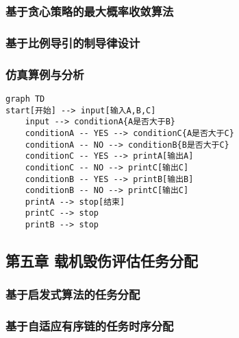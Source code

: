 \hypertarget{ux57faux4e8eux8d2aux5fc3ux7b56ux7565ux7684ux6700ux5927ux6982ux7387ux6536ux655bux7b97ux6cd5}{%
\subsubsection{基于贪心策略的最大概率收敛算法}\label{ux57faux4e8eux8d2aux5fc3ux7b56ux7565ux7684ux6700ux5927ux6982ux7387ux6536ux655bux7b97ux6cd5}}

\hypertarget{ux57faux4e8eux6bd4ux4f8bux5bfcux5f15ux7684ux5236ux5bfcux5f8bux8bbeux8ba1}{%
\subsubsection{基于比例导引的制导律设计}\label{ux57faux4e8eux6bd4ux4f8bux5bfcux5f15ux7684ux5236ux5bfcux5f8bux8bbeux8ba1}}

\hypertarget{ux4effux771fux7b97ux4f8bux4e0eux5206ux6790}{%
\subsubsection{仿真算例与分析}\label{ux4effux771fux7b97ux4f8bux4e0eux5206ux6790}}

\begin{verbatim}
graph TD
start[开始] --> input[输入A,B,C]
    input --> conditionA{A是否大于B}
    conditionA -- YES --> conditionC{A是否大于C}
    conditionA -- NO --> conditionB{B是否大于C}
    conditionC -- YES --> printA[输出A]
    conditionC -- NO --> printC[输出C]
    conditionB -- YES --> printB[输出B]
    conditionB -- NO --> printC[输出C]
    printA --> stop[结束]
    printC --> stop
    printB --> stop
\end{verbatim}

\hypertarget{ux7b2cux4e94ux7ae0-ux8f7dux673aux6bc1ux4f24ux8bc4ux4f30ux4efbux52a1ux5206ux914d}{%
\subsection{第五章
载机毁伤评估任务分配}\label{ux7b2cux4e94ux7ae0-ux8f7dux673aux6bc1ux4f24ux8bc4ux4f30ux4efbux52a1ux5206ux914d}}

\hypertarget{ux57faux4e8eux542fux53d1ux5f0fux7b97ux6cd5ux7684ux4efbux52a1ux5206ux914d}{%
\subsubsection{基于启发式算法的任务分配}\label{ux57faux4e8eux542fux53d1ux5f0fux7b97ux6cd5ux7684ux4efbux52a1ux5206ux914d}}

\hypertarget{ux57faux4e8eux81eaux9002ux5e94ux6709ux5e8fux94feux7684ux4efbux52a1ux65f6ux5e8fux5206ux914d}{%
\subsubsection{基于自适应有序链的任务时序分配}\label{ux57faux4e8eux81eaux9002ux5e94ux6709ux5e8fux94feux7684ux4efbux52a1ux65f6ux5e8fux5206ux914d}}

